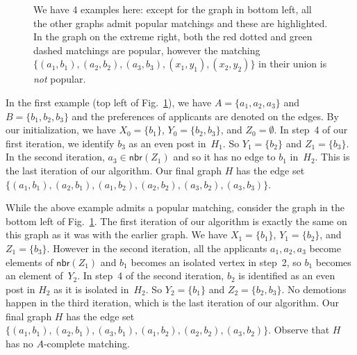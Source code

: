 \documentclass[11pt]{llncs}
\newcommand{\Nbr}{\mathsf{nbr}}
\begin{document}
\begin{center}
\begin{figure}[h!]
\begin{minipage}{0.28\textwidth}
\end{minipage}

\caption{We have 4 examples here: except for the graph in bottom left, all the other graphs admit popular matchings and these are highlighted. In the graph on the extreme right, both the red  dotted and green dashed matchings are popular, however the matching $\{(a_1,b_1),(a_2,b_2),(a_3,b_3),(x_1,y_1),(x_2,y_2)\}$ in their union is {\em not} popular.}
\label{fig:AppA}
\end{figure}
\end{center}

In the first example (top left of Fig.~\ref{fig:AppA}), we have $A = \{a_1,a_2,a_3\}$ and $B = \{b_1,b_2,b_3\}$ 
and the preferences of applicants are denoted on the edges.  By our initialization, we have $X_0 = \{b_1\}$, 
$Y_0 = \{b_2,b_3\}$, and $Z_0 = \emptyset$. In step~4 of our first iteration, we identify $b_3$ as an even post in~$H_1$. 
So $Y_1 = \{b_2\}$ and $Z_1 = \{b_3\}$. In the second iteration, $a_3 \in \Nbr(Z_1)$ and so it has no edge to $b_1$ in~$H_2$. 
This is the last iteration of our algorithm. Our final graph $H$ has the edge set 
$\{(a_1,b_1),(a_2,b_1),(a_1,b_2),(a_2,b_2),(a_3,b_2),(a_3,b_3)\}$.

While the above example admits a popular matching,
consider the graph in the bottom left of Fig.~\ref{fig:AppA}. The first iteration of our algorithm is exactly the same
on this graph as it was with the earlier graph. We have $X_1 = \{b_1\}$, $Y_1 = \{b_2\}$, and $Z_1 = \{b_3\}$.
However in the second iteration, all the applicants $a_1,a_2,a_3$ become elements of $\Nbr(Z_1)$ and $b_1$ becomes an isolated vertex
in step~2, so $b_1$ becomes an element of~$Y_2$. In step~4 of the second iteration, $b_2$ is identified as an even post in $H_2$ 
as it is isolated in~$H_2$.  So $Y_2 = \{b_1\}$ and $Z_2 = \{b_2,b_3\}$. No demotions happen in the third iteration, 
which is the last iteration of our algorithm. Our final graph $H$ has the edge set $\{(a_1,b_1),(a_2,b_1),(a_3,b_1),(a_1,b_2),(a_2,b_2),(a_3,b_2)\}$. Observe that $H$ has no 
$A$-complete matching.
\end{document}
